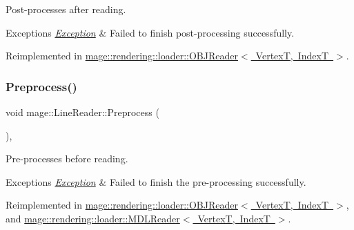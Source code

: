 Post-\/processes after reading.


\begin{DoxyExceptions}{Exceptions}
{\em \mbox{\hyperlink{classmage_1_1_exception}{Exception}}} & Failed to finish post-\/processing successfully. \\
\hline
\end{DoxyExceptions}


Reimplemented in \mbox{\hyperlink{classmage_1_1rendering_1_1loader_1_1_o_b_j_reader_a281c16ef7d20a7c1416923f3cadee33a}{mage\+::rendering\+::loader\+::\+O\+B\+J\+Reader$<$ Vertex\+T, Index\+T $>$}}.

\mbox{\label{classmage_1_1_line_reader_ad81a84bf9ecd81b9a391698afbd5eb61}} 
\subsubsection{\texorpdfstring{Preprocess()}{Preprocess()}}
{\footnotesize\ttfamily void mage\+::\+Line\+Reader\+::\+Preprocess (\begin{DoxyParamCaption}{ }\end{DoxyParamCaption})\hspace{0.3cm}{\ttfamily [private]}, {\ttfamily [virtual]}}

Pre-\/processes before reading.


\begin{DoxyExceptions}{Exceptions}
{\em \mbox{\hyperlink{classmage_1_1_exception}{Exception}}} & Failed to finish the pre-\/processing successfully. \\
\hline
\end{DoxyExceptions}


Reimplemented in \mbox{\hyperlink{classmage_1_1rendering_1_1loader_1_1_o_b_j_reader_ad082a6295259f7e8af2c60c182ea55d3}{mage\+::rendering\+::loader\+::\+O\+B\+J\+Reader$<$ Vertex\+T, Index\+T $>$}}, and \mbox{\hyperlink{classmage_1_1rendering_1_1loader_1_1_m_d_l_reader_a397f0c0eedc56c983fc3a7074aa4e577}{mage\+::rendering\+::loader\+::\+M\+D\+L\+Reader$<$ Vertex\+T, Index\+T $>$}}.

\mbox{\label{classmage_1_1_line_reader_ad351b7c68e5784d0dca690a5b8fe7528}} 
